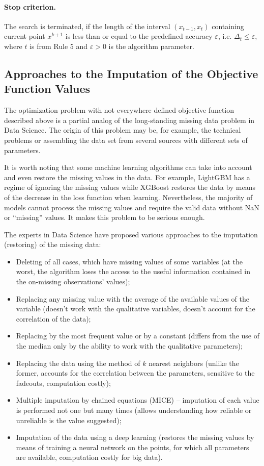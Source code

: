 \documentclass[runningheads]{llncs}
\begin{document}
\paragraph{Stop criterion.} The search is terminated, if the length of the interval $(x_{t-1},x_t)$ containing current point $x^{k+1}$ is less than or equal to the predefined accuracy $\varepsilon$, i.e. $\Delta _t \leq \varepsilon$, where $t$ is from Rule 5 and $\varepsilon>0$ is the algorithm parameter.

\subsection{ Approaches to the Imputation of the Objective Function Values }

The optimization problem with not everywhere defined objective function described above is a partial analog of the long-standing missing data problem in Data Science. The origin of this problem may be, for example, the technical problems or assembling the data set from several sources with different sets of parameters.

It is worth noting that some machine learning algorithms can take into account and even restore the missing values in the data. For example, LightGBM has a regime of ignoring the missing values while XGBoost restores the data by means of the decrease in the loss function when learning. Nevertheless, the majority of models cannot process the missing values and require the valid data without NaN or ``missing'' values. It makes this problem to be serious enough.

The experts in Data Science have proposed various approaches to the imputation (restoring) of the missing data:
\begin{itemize}
  \item Deleting of all cases, which have missing values of some variables (at the worst, the algorithm loses the access to the useful information contained in the on-missing observations’ values);
  \item Replacing any missing value with the average of the available values of the variable (doesn’t work with the qualitative variables, doesn’t account for the correlation of the data);
  \item Replacing by the most frequent value or by a constant (differs from the use of the median only by the ability to work with the qualitative parameters);
  \item Replacing the data using the method of $k$ nearest neighbors (unlike the former, accounts for the correlation between the parameters, sensitive to the fadeouts, computation costly);
  \item Multiple imputation by chained equations (MICE) -- imputation of each value is performed not one but many times (allows understanding how reliable or unreliable is the value suggested);
  \item Imputation of the data using a deep learning (restores the missing values by means of training a neural network on the points, for which all parameters are available, computation costly for big data).
\end{itemize}
\end{document}

